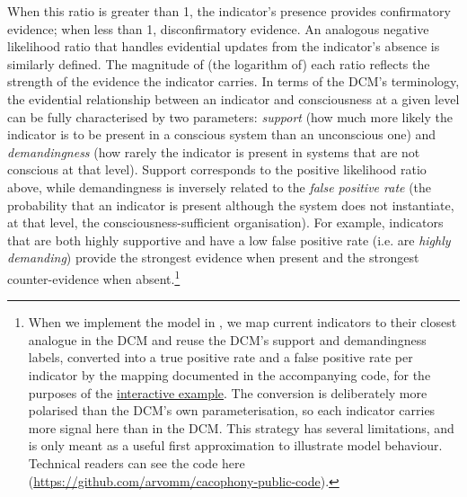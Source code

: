 \documentclass[11pt, a4paper, onecolumn, gdm]{google}
\begin{document}
When this ratio is greater than 1, the indicator's presence provides confirmatory evidence; when less than 1, disconfirmatory evidence.
An analogous negative likelihood ratio that handles evidential updates from the indicator's absence is similarly defined.
The magnitude of (the logarithm of) each ratio reflects the strength of the evidence the indicator carries.
In terms of the DCM's terminology, the evidential relationship between an indicator and consciousness at a given level can be fully characterised by two parameters: \emph{support} (how much more likely the indicator is to be present in a conscious system than an unconscious one) and \emph{demandingness} (how rarely the indicator is present in systems that are not conscious at that level).
Support corresponds to the positive likelihood ratio above, while demandingness is inversely related to the \emph{false positive rate} (the probability that an indicator is present although the system does not instantiate, at that level, the consciousness-sufficient organisation).
For example, indicators that are both highly supportive and have a low false positive rate (i.e. are \emph{highly demanding}) provide the strongest evidence when present and the strongest counter-evidence when absent.\footnote{When we implement the model in , we map current indicators to their closest analogue in the DCM and reuse the DCM's support and demandingness labels, converted into a true positive rate and a false positive rate per indicator by the mapping documented in the accompanying code, for the purposes of the \href{https://ai-cognition.org/cacophony-tool/}{interactive example}. The conversion is deliberately more polarised than the DCM's own parameterisation, so each indicator carries more signal here than in the DCM. This strategy has several limitations, and is only meant as a useful first approximation to illustrate model behaviour. Technical readers can see the code here (\url{https://github.com/arvomm/cacophony-public-code}).}
\end{document}
